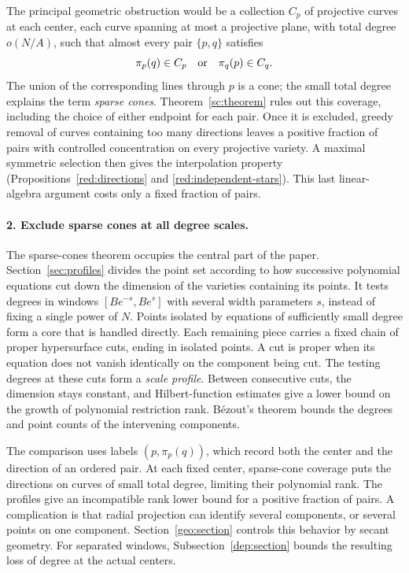 The principal geometric obstruction would be a collection \(C_p\)
of projective curves at each center, each curve spanning at most a
projective plane, with total degree \(o(N/A)\), such that almost
every pair \(\{p,q\}\) satisfies
\[
 \pi_p(q)\in C_p\quad\hbox{or}\quad\pi_q(p)\in C_q.
\]
The union of the corresponding lines through \(p\) is a cone;
the small total degree explains the term \emph{sparse cones}.
Theorem~\ref{sc:theorem} rules out this coverage, including the
choice of either endpoint for each pair. Once it is excluded, greedy
removal of curves containing too many directions leaves a positive
fraction of pairs with controlled concentration on every projective
variety. A maximal symmetric selection then gives the interpolation
property (Propositions~\ref{red:directions} and
\ref{red:independent-stars}). This last linear-algebra argument costs
only a fixed fraction of pairs.

\paragraph{2. Exclude sparse cones at all degree scales.}
The sparse-cones theorem occupies the central part of the paper.
Section~\ref{sec:profiles} divides the point set according to how
successive polynomial equations cut down the dimension of the
varieties containing its points. It tests degrees in windows
\([B e^{-s},B e^s]\) with several width parameters \(s\), instead of
fixing a single power of \(N\). Points isolated by equations of
sufficiently small degree form a core that is handled directly.
Each remaining piece carries a fixed chain of proper hypersurface
cuts, ending in isolated points.
A cut is proper when its equation does not vanish identically on
the component being cut. The testing degrees at these cuts form a
\emph{scale profile}. Between consecutive cuts, the dimension stays
constant, and Hilbert-function estimates give a lower bound on the
growth of polynomial restriction rank. B\'ezout's theorem bounds
the degrees and point counts of the intervening components.

The comparison uses labels \((p,\pi_p(q))\), which record both the
center and the direction of an ordered pair. At each fixed center,
sparse-cone coverage puts the directions on curves of small total
degree, limiting their polynomial rank. The profiles give an incompatible rank lower bound
for a positive fraction of pairs. A complication is that radial
projection can identify several components, or several points on
one component. Section~\ref{geo:section} controls this behavior by
secant geometry. For separated windows, Subsection~\ref{dep:section}
bounds the resulting loss of degree at the actual centers.

